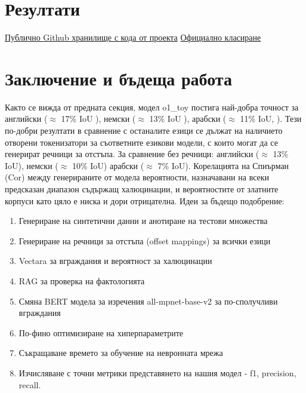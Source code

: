 \documentclass[12pt]{article}
\begin{document}
	\section{Резултати}
	
	\href{https://github.com/Kr1s1m/SemEval-2025_Task-3/}{Публично Github хранилище с кода от проекта} 
	\href{https://mushroomeval.pythonanywhere.com/submission/}{Официално класиране}
	
	\section{Заключение и бъдеща работа}
	
	Както се вижда от предната секция, модел o1\_toy постига най-добра точност за английски ($\approx$ 17\% IoU ), немски ($\approx$ 13\% IoU ), арабски ($\approx$ 11\% IoU, ). Тези по-добри резултати в сравнение с останалите езици се дължат на наличието отворени токенизатори за съответните езикови модели, с които могат да се генерират речници за отстъпа. За сравнение без речници: английски ($\approx$ 13\% IoU), немски ($\approx$ 10\% IoU) арабски ($\approx$ 7\% IoU). Корелацията на Спиърман (Cor) между генерираните от модела вероятности, назначавани на всеки предсказан диапазон съдържащ халюцинации, и вероятностите от златните корпуси като цяло е ниска и дори отрицателна.
	\newline\newline Идеи за бъдещо подобрение:
	
	\begin{enumerate}
		\item[\textbullet] Генериране на синтетични данни и анотиране на тестови множества
		\item[\textbullet] Генериране на речници за отстъпа (offset mappings) за всички езици
		\item[\textbullet] Vectara за вграждания и вероятност за халюцинации
		\item[\textbullet] RAG за проверка на фактологията
		\item[\textbullet] Смяна BERT модела за изречения all-mpnet-base-v2 за по-сполучливи вграждания
		\item[\textbullet] По-фино оптимизиране на хиперпараметрите
		\item[\textbullet] Съкращаване времето за обучение на невронната мрежа
		\item[\textbullet] Изчисляване с точни метрики представянето на нашия модел - f1, precision, recall.

	\end{enumerate}
\end{document}
